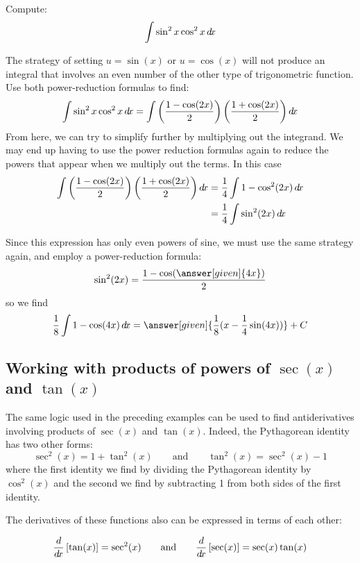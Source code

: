 \documentclass{ximera}
\begin{document}
\begin{example}
  Compute:
  \[
  \int \sin^2x\cos^2x\mathop{}\!d\! x
  \]
  \begin{explanation} 
    The strategy of setting $u=\sin(x)$ or $u=\cos(x)$ will not produce an integral that involves an even number of the other type of trigonometric function. Use both power-reduction formulas to find:
    \[
    \int \sin^2x\cos^2x\mathop{}\!d\! x=\int \left( \frac{1-\cos(2x)}{2}\right)
    \left(\frac{1+\cos(2x)}{2}\right) \mathop{}\!d\! x
    \]
    From here, we can try to simplify further by multiplying out the integrand. We may end up having to
    use the power reduction formulas again to reduce the powers that appear when we multiply out the terms.  In this case
    \begin{align*}
      \int \left(\frac{1-\cos(2x)}{2}\right) \left( \frac{1+\cos(2x)}{2}\right) \mathop{}\!d\! x &= \frac{1}{4} \int 1-\cos^2(2x) \mathop{}\!d\! x\\
      &= \frac{1}{4} \int \sin^2(2x) \mathop{}\!d\! x
    \end{align*}
    
    Since this expression has only even powers of sine, we must use
    the same strategy again, and employ a power-reduction formula:
    \[
    \sin^2(2x) = \frac{1-\cos(\answer[given]{4x})}{2}
    \]
    so we find
    \[
    \frac{1}{8}\int 1-\cos(4x) \d x = \answer[given]{\frac{1}{8}(x - \frac{1}{4}\sin(4x))} + C
    \]
  \end{explanation}
\end{example}




\subsection{Working with products of powers of $\sec(x)$ and $\tan(x)$}

The same logic used in the preceding examples can be used to find antiderivatives involving products of $\sec(x)$ and $\tan(x)$.  Indeed, the Pythagorean identity has two other forms:
\[
\sec^2(x) = 1 + \tan^2(x)  \qquad\text{and}\qquad \tan^2(x) = \sec^2(x) - 1  
\]
where the first identity we find by dividing the Pythagorean identity by
$\cos^2(x)$ and the second we find by subtracting 1 from both sides of the first identity. 

The derivatives of these functions also can be expressed in terms of each other:

\[
\frac{d}{\mathop{}\!d\! x} \left[\tan(x)\right] = \sec^2(x) \qquad\text{and}\qquad \frac{d}{\mathop{}\!d\! x} \left[\sec(x)\right] = \sec(x)\tan(x)
\]
\end{document}
